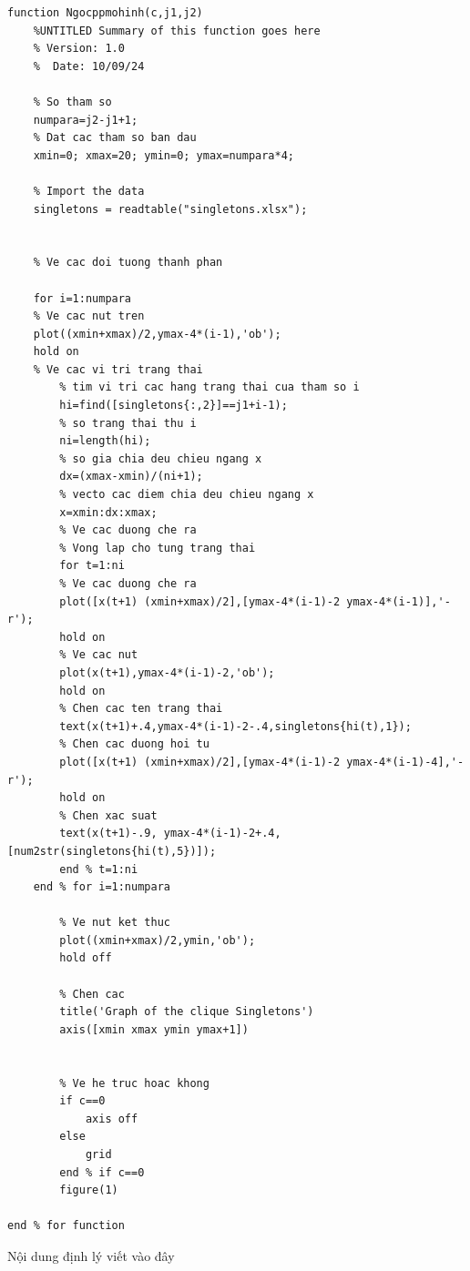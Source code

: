\begin{matlab}
    \begin{lstlisting}
function Ngocppmohinh(c,j1,j2)
    %UNTITLED Summary of this function goes here
    % Version: 1.0
    %  Date: 10/09/24

    % So tham so
    numpara=j2-j1+1;
    % Dat cac tham so ban dau
    xmin=0; xmax=20; ymin=0; ymax=numpara*4;

    % Import the data
    singletons = readtable("singletons.xlsx");


    % Ve cac doi tuong thanh phan

    for i=1:numpara
    % Ve cac nut tren
    plot((xmin+xmax)/2,ymax-4*(i-1),'ob');
    hold on
    % Ve cac vi tri trang thai
        % tim vi tri cac hang trang thai cua tham so i
        hi=find([singletons{:,2}]==j1+i-1);
        % so trang thai thu i
        ni=length(hi);
        % so gia chia deu chieu ngang x
        dx=(xmax-xmin)/(ni+1);
        % vecto cac diem chia deu chieu ngang x
        x=xmin:dx:xmax;
        % Ve cac duong che ra
        % Vong lap cho tung trang thai
        for t=1:ni
        % Ve cac duong che ra
        plot([x(t+1) (xmin+xmax)/2],[ymax-4*(i-1)-2 ymax-4*(i-1)],'-r');
        hold on
        % Ve cac nut
        plot(x(t+1),ymax-4*(i-1)-2,'ob');
        hold on
        % Chen cac ten trang thai
        text(x(t+1)+.4,ymax-4*(i-1)-2-.4,singletons{hi(t),1});
        % Chen cac duong hoi tu
        plot([x(t+1) (xmin+xmax)/2],[ymax-4*(i-1)-2 ymax-4*(i-1)-4],'-r');
        hold on
        % Chen xac suat
        text(x(t+1)-.9, ymax-4*(i-1)-2+.4, [num2str(singletons{hi(t),5})]);
        end % t=1:ni
    end % for i=1:numpara

        % Ve nut ket thuc
        plot((xmin+xmax)/2,ymin,'ob');
        hold off
        
        % Chen cac 
        title('Graph of the clique Singletons')
        axis([xmin xmax ymin ymax+1])
        
        
        % Ve he truc hoac khong
        if c==0
            axis off
        else
            grid
        end % if c==0
        figure(1)

end % for function
    \end{lstlisting}
\end{matlab}

\begin{dl}
 Nội dung định lý viết vào đây   
\end{dl}



